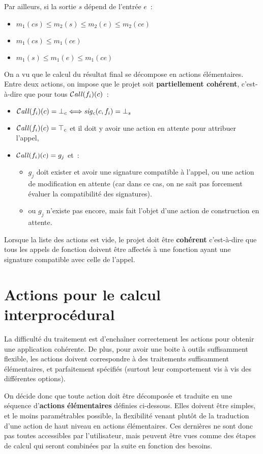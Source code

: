 Par ailleurs, si la sortie $s$ dépend de l'entrée $e$~:
\begin{itemize}
  \item $m_1(cs) \leq m_2(s) \leq m_2(e) \leq m_2(ce)$
  \item $m_1(cs) \leq m_1(ce)$
  \item $m_1(s) \leq m_1(e) \leq m_1(ce)$
\end{itemize}
\bb

On a vu que le calcul du résultat final se décompose en actions élémentaires.
Entre deux actions, on impose que le projet soit {\bf partiellement cohérent},
c'est-à-dire que pour tous $\operatorname{\mathcal{C\mathit{all}}}(f_i)(c)$~:
\begin{itemize}
  \item $\operatorname{\mathcal{C\mathit{all}}}(f_i)(c) = {\bot}_c \Longleftrightarrow \mathit{sig_c}(c, f_i) = {\bot}_s$
  \item $\operatorname{\mathcal{C\mathit{all}}}(f_i)(c) = {\top}_c$ et il doit y avoir une action en attente pour
    attribuer l'appel,
  \item $\operatorname{\mathcal{C\mathit{all}}}(f_i)(c) = g_j$ et~:
    \begin{itemize}
      \item $g_j$ doit exister et avoir une signature compatible à l'appel,
      ou une action de modification en attente
	(car dans ce cas, on ne sait pas forcement évaluer la compatibilité des
	signatures).
      \item ou $g_j$ n'existe pas encore, mais fait l'objet d'une action de
	construction en attente.
    \end{itemize}
\end{itemize}
\bb

Lorsque la liste des actions est vide, le projet doit être {\bf cohérent}
c'est-à-dire que tous les appels de fonction doivent être affectés
à une fonction ayant une signature compatible avec celle de l'appel.


\section{Actions pour le calcul interprocédural}\label{sec-def-actions}

La difficulté du traitement est d'enchaîner correctement les actions pour
obtenir une application cohérente.  De plus, pour avoir une boite à outils
suffisamment flexible, les actions doivent correspondre à des traitements
suffisamment élémentaires, et parfaitement spécifiés (surtout leur comportement
vis à vis des différentes options). 

On  décide donc que toute action doit être décomposée et traduite 
en une séquence d'{\bf actions élémentaires} définies ci-dessous.
Elles doivent être simples, et
le moins paramétrables possible, la flexibilité venant plutôt de la
traduction d'une action de haut niveau en actions élémentaires.
Ces dernières ne sont donc pas toutes accessibles par l'utilisateur,
mais peuvent être vues comme des étapes de calcul qui seront combinées 
par la suite en fonction des besoins.
\bb

